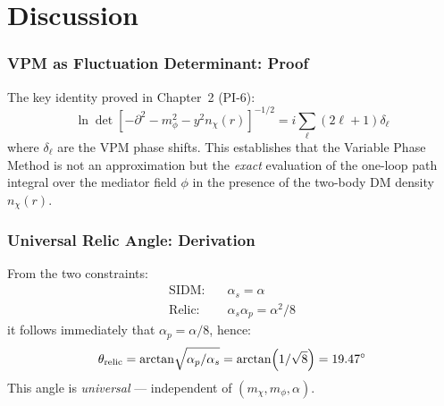 \documentclass[12pt,a4paper]{article}
\newcommand{\alphass}{\alpha_s}
\newcommand{\alphapp}{\alpha_p}
\newcommand{\thetarel}{\theta_{\rm relic}}
\begin{document}


\appendix


\part*{Discussion}




\section{VPM as Fluctuation Determinant: Proof}
\label{app:vpm_proof}

The key identity proved in Chapter~2 (PI-6):
\begin{equation}
  \ln \det\!\left[-\partial^2 - m_\phi^2 - y^2 n_\chi(r)\right]^{-1/2}
  = i\sum_\ell (2\ell+1)\delta_\ell
\end{equation}
where $\delta_\ell$ are the VPM phase shifts. This establishes that the
Variable Phase Method is not an approximation but the \emph{exact} evaluation
of the one-loop path integral over the mediator field $\phi$ in the presence
of the two-body DM density $n_\chi(r)$.

\section{Universal Relic Angle: Derivation}
\label{app:relic_angle}

From the two constraints:
\begin{align}
  \text{SIDM:} & \quad \alphass = \alpha \\
  \text{Relic:} & \quad \alphass \alphapp = \alpha^2/8
\end{align}
it follows immediately that $\alphapp = \alpha/8$, hence:
\begin{equation}
  \thetarel = \arctan\!\sqrt{\alphapp/\alphass} = \arctan(1/\sqrt{8}) = 19.47^\circ
\end{equation}
This angle is \emph{universal} — independent of $(m_\chi, m_\phi, \alpha)$.
\end{document}
